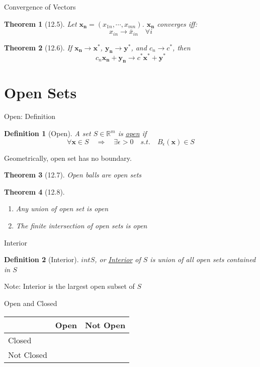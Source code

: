 \documentclass[final]{beamer}
\newtheorem{defn}{Definition}
\newtheorem{thm}{Theorem}
\begin{document}
\begin{frame}[t]{Convergence of Vectors}
	\begin{thm}
		[12.5] Let $\mathbf{x_n}=(x_{1n},\cdots,x_{mn})$. $\mathbf{x_n}$ converges iff:
		\[
			x_{in} \rightarrow \bar x_{in} \quad \forall i
		\]
	\end{thm}
	\begin{thm}
		[12.6] If $\mathbf{x_n}\rightarrow\mathbf{x^\ast}$, $\mathbf{y_n} \rightarrow\mathbf{y^\ast}$, and $c_n\rightarrow c^\ast$, then\[
			c_n\mathbf{x_n}+\mathbf{y_n}\rightarrow c^\ast \mathbf{x^\ast} + \mathbf{y^\ast}
		\]
	\end{thm}
\end{frame}

\section{Open Sets} %
\label{sec:open_sets}
\begin{frame}[t]{Open: Definition}
	\begin{defn}
		[Open] A set $S\in\mathbb{R}^m$ is \uline{open} if \[
			\forall \mathbf{x}\in S \quad\Rightarrow\quad \exists \epsilon>0 \quad s.t.\quad B_\epsilon(\mathbf{x})\in S
		\]
	\end{defn}
	Geometrically, open set has no boundary.
	\begin{thm}
		[12.7] Open balls are open sets
	\end{thm}
	\begin{thm}[12.8]
		\begin{enumerate}
			\item Any union of open set is open
			\item The finite intersection of open sets is open
		\end{enumerate}
	\end{thm}
\end{frame}

\begin{frame}[t]{Interior}
	\begin{defn}
		[Interior]
		$int S$, or \uline{Interior} of $S$ is union of all open sets contained in $S$
	\end{defn}
	Note: Interior is the largest open subset of $S$
	\begin{block}
		{Open and Closed}
		\begin{center}
			\begin{tabular}{l|ll}
			& Open & Not Open\\
			\hline
			Closed &&\\
			Not Closed &&
			\end{tabular}
		\end{center}
	\end{block}
\end{frame}
\end{document}
